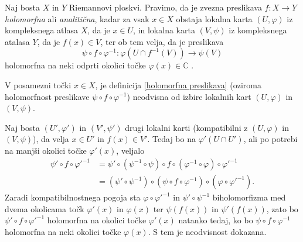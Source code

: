 \documentclass[mat1]{fmfdelo}
\numberwithin{equation}{section}
\newcommand{\C}{\mathbb C}
\newcommand{\inv}{^{-1}}
\theoremstyle{definition}
\begin{document}


\begin{definicija}
    \label{holomorfna preslikava}
    Naj bosta $X$ in $Y$ Riemannovi ploskvi. Pravimo, da je zvezna preslikava $f:X \to Y$ \emph{holomorfna} ali \emph{analitična}, kadar za vsak $x \in X$ obstaja lokalna karta $(U, \varphi)$ iz kompleksnega atlasa $X$, da je $x \in U$, in lokalna karta $(V, \psi)$ iz kompleksnega atalasa $Y$, da je $f(x) \in V$, ter ob tem velja, da je preslikava  
    \[
        \psi \circ f \circ \varphi\inv : \varphi(U \cap f\inv(V)) \to \psi(V)
    \]
    holomorfna na neki odprti okolici točke $\varphi(x) \in \C$ .
\end{definicija}

\begin{trditev}
    V posamezni točki $x \in X$, je definicija \ref{holomorfna preslikava} (oziroma holomorfnost preslikave $\psi \circ f \circ \varphi\inv$) neodvisna od izbire lokalnih kart $(U, \varphi)$ in $(V, \psi)$. 
\end{trditev}

\begin{dokaz}
    Naj bosta $(U', \varphi')$ in $(V', \psi')$ drugi lokalni karti (kompatibilni z $(U, \varphi)$ in $(V, \psi)$), da velja $x \in U'$ in $f(x) \in V'$. Tedaj bo na $\varphi'(U \cap U')$, ali po potrebi na manjši okolici točke $\varphi'(x)$, veljalo
    \begin{align*}    
        \psi' \circ f \circ {\varphi'}\inv &= 
        \psi' \circ (\psi\inv \circ \psi) \circ f \circ (\varphi\inv \circ \varphi) \circ {\varphi'}\inv \\
        &= (\psi' \circ \psi\inv) \circ (\psi \circ f \circ \varphi\inv) \circ (\varphi \circ {\varphi'}\inv).
    \end{align*}
    Zaradi kompatibilnostnega pogoja sta $\varphi \circ {\varphi'}\inv$ in $\psi' \circ \psi\inv$ biholomorfizma med dvema okolicama točk $\varphi'(x)$ in $\varphi(x)$ ter $\psi(f(x))$ in $\psi'(f(x))$, zato bo $\psi' \circ f \circ {\varphi'}\inv$ holomorfna na okolici točke $\varphi'(x)$ natanko tedaj, ko bo $\psi \circ f \circ \varphi\inv$ holomorfna na neki okolici točke $\varphi(x)$. S tem je neodvisnost dokazana. 
\end{dokaz}
\end{document}
